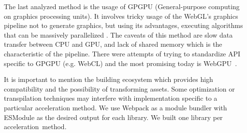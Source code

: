 The last analyzed method is the usage of GPGPU (General-purpose computing on graphics processing units). It involves tricky usage of the WebGL's graphics pipeline not to generate graphics, but using its advantages, executing algorithms that can be massively parallelized \cite{sapuan2018general}. The caveats of this method are slow data transfer between CPU and GPU, and lack of shared memory which is the characteristic of the pipeline. There were attempts of trying to standardize API specific to GPGPU (e.g. WebCL) and the most promising today is WebGPU~\cite{webgpu_2022}.

It is important to mention the building ecosystem which provides high compatibility and the possibility of transforming assets. Some optimization or transpilation techniques may interfere with implementation specific to a particular acceleration method. We use Webpack \cite{webpack} as a module bundler with ESModule \cite{PALTOGLOU2021111049} as the desired output for each library. We built one library per acceleration~method.
